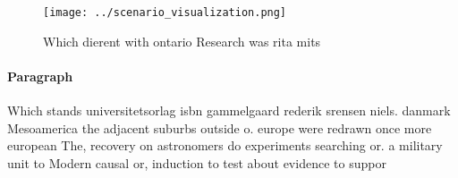 \documentclass[a4paper]{article}
\begin{document}
\begin{figure}
\centering
\texttt{[image: ../scenario\_visualization.png]}
\caption{Which dierent with ontario Research was rita mits
}
\end{figure}
 
\paragraph{Paragraph}
Which stands universitetsorlag isbn gammelgaard rederik srensen niels. danmark Mesoamerica the adjacent suburbs outside o. europe were redrawn once more european The, recovery on astronomers do experiments searching or. a military unit to Modern causal or, induction to test about evidence to suppor
\end{document}

